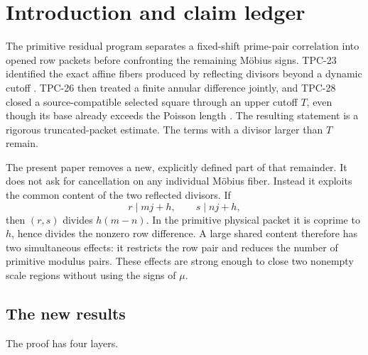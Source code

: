 \section{Introduction and claim ledger}
\label{sec:tpc29-introduction}

The primitive residual program separates a fixed-shift prime-pair
correlation into opened row packets before confronting the remaining
M\"obius signs.  TPC-23 identified the exact affine fibers produced by
reflecting divisors beyond a dynamic cutoff \citep{WangTPC23}.  TPC-26
then treated a finite annular difference jointly, and TPC-28 closed a
source-compatible selected square through an upper cutoff $T$, even
though its base already exceeds the Poisson length
\citep{WangTPC26,WangTPC28}.  The resulting statement is a rigorous
truncated-packet estimate.  The terms with a divisor larger than $T$
remain.

The present paper removes a new, explicitly defined part of that
remainder.  It does not ask for cancellation on any individual
M\"obius fiber.  Instead it exploits the common content of the two
reflected divisors.  If
\[
 r\mid mj+h,\qquad s\mid nj+h,
\]
then $(r,s)$ divides $h(m-n)$.  In the primitive physical packet it is
coprime to $h$, hence divides the nonzero row difference.  A large
shared content therefore has two simultaneous effects: it restricts
the row pair and reduces the number of primitive modulus pairs.  These
effects are strong enough to close two nonempty scale regions without
using the signs of $\mu$.

\subsection{The new results}

The proof has four layers.

